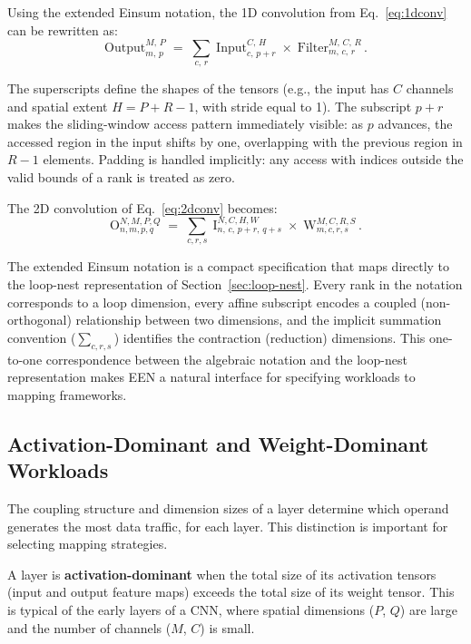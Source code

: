 Using the extended Einsum notation, the 1D convolution from
Eq.~\eqref{eq:1dconv} can be rewritten as:
\begin{equation}
\label{eq:een-1dconv}
\mathrm{Output}^{M,\,P}_{m,\,p}
  \;=\; \sum_{c,\,r}\;
  \mathrm{Input}^{C,\,H}_{c,\,p+r} \;\times\;
  \mathrm{Filter}^{M,\,C,\,R}_{m,\,c,\,r}\,.
\end{equation}

\noindent
The superscripts define the shapes of the tensors (e.g., the input has
$C$ channels and spatial extent $H = P + R - 1$, with stride equal to 1).
The subscript $p + r$ makes the sliding-window access pattern
immediately visible: as $p$ advances, the accessed region in the input
shifts by one, overlapping with the previous region in $R - 1$ elements.
Padding is handled implicitly: any access with indices outside the
valid bounds of a rank is treated as zero.

The 2D convolution of Eq.~\eqref{eq:2dconv} becomes:
\begin{equation}
\label{eq:een-2dconv}
\mathrm{O}^{N,M,P,Q}_{n,m,p,q}
  \;=\; \sum_{c,r,s}\;
  \mathrm{I}^{N,C,H,W}_{n,\,c,\,p+r,\,q+s} \;\times\;
  \mathrm{W}^{M,C,R,S}_{m,c,r,s}\,.
\end{equation}

\noindent
The extended Einsum notation is a compact specification that maps
directly to the loop-nest representation of
Section~\ref{sec:loop-nest}.
Every rank in the notation corresponds to a loop dimension, every affine
subscript encodes a coupled (non-orthogonal) relationship between two
dimensions, and the implicit summation convention ($\sum_{c,r,s}$)
identifies the contraction (reduction) dimensions.
This one-to-one correspondence between the algebraic notation and the
loop-nest representation makes EEN a natural interface for specifying
workloads to mapping frameworks.


\subsection{Activation-Dominant and Weight-Dominant Workloads}
\label{sec:act-weight-dominant}

The coupling structure and dimension sizes of a layer determine which
operand generates the most data traffic, for each layer.
This distinction is important for selecting mapping strategies.

A layer is \textbf{activation-dominant} when the total size of its
activation tensors (input and output feature maps) exceeds the total
size of its weight tensor.
This is typical of the early layers of a CNN, where spatial dimensions
($P$, $Q$) are large and the number of channels ($M$, $C$) is small.

